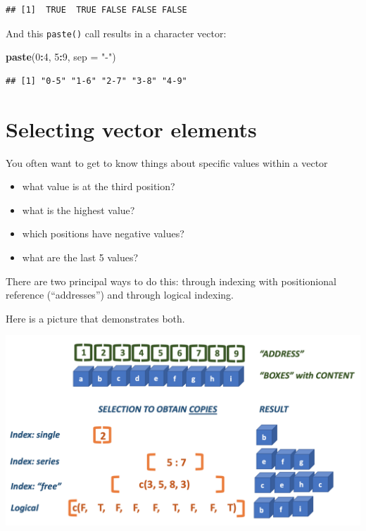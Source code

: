\documentclass[]{book}
\newenvironment{Shaded}{\begin{snugshade}}{\end{snugshade}}
\newcommand{\DataTypeTok}[1]{\textcolor[rgb]{0.13,0.29,0.53}{#1}}
\newcommand{\DecValTok}[1]{\textcolor[rgb]{0.00,0.00,0.81}{#1}}
\newcommand{\KeywordTok}[1]{\textcolor[rgb]{0.13,0.29,0.53}{\textbf{#1}}}
\newcommand{\NormalTok}[1]{#1}
\newcommand{\OperatorTok}[1]{\textcolor[rgb]{0.81,0.36,0.00}{\textbf{#1}}}
\newcommand{\StringTok}[1]{\textcolor[rgb]{0.31,0.60,0.02}{#1}}
\providecommand{\tightlist}{%
  \setlength{\itemsep}{0pt}\setlength{\parskip}{0pt}}
\begin{document}
\begin{verbatim}
## [1]  TRUE  TRUE FALSE FALSE FALSE
\end{verbatim}

And this \texttt{paste()} call results in a character vector:

\begin{Shaded}
\begin{Highlighting}[]
\KeywordTok{paste}\NormalTok{(}\DecValTok{0}\OperatorTok{:}\DecValTok{4}\NormalTok{, }\DecValTok{5}\OperatorTok{:}\DecValTok{9}\NormalTok{, }\DataTypeTok{sep =} \StringTok{"-"}\NormalTok{)}
\end{Highlighting}
\end{Shaded}

\begin{verbatim}
## [1] "0-5" "1-6" "2-7" "3-8" "4-9"
\end{verbatim}

\hypertarget{selecting-vector-elements}{%
\section{Selecting vector elements}\label{selecting-vector-elements}}

You often want to get to know things about specific values within a vector

\begin{itemize}
\tightlist
\item
  what value is at the third position?
\item
  what is the highest value?
\item
  which positions have negative values?
\item
  what are the last 5 values?
\end{itemize}

There are two principal ways to do this: through indexing with positionional reference (``addresses'') and through logical indexing.

Here is a picture that demonstrates both.

\includegraphics{figures/indexing_in_R_s.png}
\end{document}
